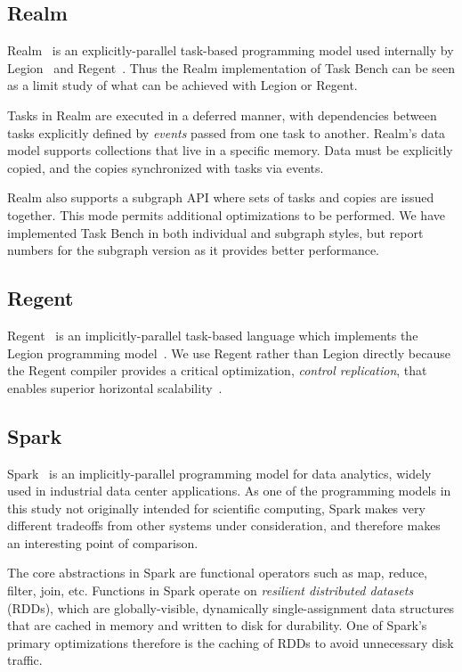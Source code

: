 \subsection{Realm}

Realm~\cite{Realm14} is an explicitly-parallel task-based programming
model used internally by Legion~\cite{Legion12} and
Regent~\cite{Regent15}. Thus the Realm implementation of Task Bench can be
seen as a limit study of what can be achieved with Legion or Regent.

Tasks in Realm are executed in a deferred manner, with dependencies
between tasks explicitly defined by \emph{events} passed from one task
to another. Realm's data model supports collections that live in a
specific memory. Data must be explicitly copied, and the copies
synchronized with tasks via events.

Realm also supports a subgraph API where sets of tasks and copies are
issued together. This mode permits additional optimizations to be
performed. We have implemented Task Bench in both individual and
subgraph styles, but report numbers for the subgraph version as it
provides better performance.

\subsection{Regent}

Regent~\cite{Regent15} is an implicitly-parallel task-based language
which implements the Legion programming model~\cite{Legion12}. We use
Regent rather than Legion directly because the Regent compiler
provides a critical optimization, \emph{control replication}, that
enables superior horizontal scalability~\cite{ControlReplication17}.

\subsection{Spark}

Spark~\cite{Spark10} is an implicitly-parallel programming model for
data analytics, widely used in industrial data center applications. As
one of the programming models in this study not originally intended
for scientific computing, Spark makes very different tradeoffs from
other systems under consideration, and therefore makes an interesting
point of comparison.

The core abstractions in Spark are functional operators such as map,
reduce, filter, join, etc. Functions in Spark operate on
\emph{resilient
  distributed datasets} (RDDs), which are globally-visible,
dynamically single-assignment data structures that are cached in memory
and written to disk for durability. One of Spark's primary
optimizations therefore is the caching of RDDs to avoid unnecessary
disk traffic.

